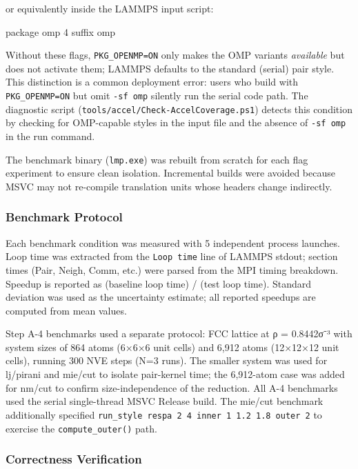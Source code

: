 \documentclass[
  11pt,
]{article}
\newenvironment{Shaded}{}{}
\newcommand{\NormalTok}[1]{#1}
\begin{document}
or equivalently inside the LAMMPS input script:

\begin{Shaded}
\begin{Highlighting}[]
\NormalTok{package omp 4}
\NormalTok{suffix omp}
\end{Highlighting}
\end{Shaded}

Without these flags, \texttt{PKG\_OPENMP=ON} only makes the OMP variants
\emph{available} but does not activate them; LAMMPS defaults to the
standard (serial) pair style. This distinction is a common deployment
error: users who build with \texttt{PKG\_OPENMP=ON} but omit
\texttt{-sf\ omp} silently run the serial code path. The diagnostic
script (\texttt{tools/accel/Check-AccelCoverage.ps1}) detects this
condition by checking for OMP-capable styles in the input file and the
absence of \texttt{-sf\ omp} in the run command.

The benchmark binary (\texttt{lmp.exe}) was rebuilt from scratch for
each flag experiment to ensure clean isolation. Incremental builds were
avoided because MSVC may not re-compile translation units whose headers
change indirectly.

\subsubsection{Benchmark Protocol}\label{benchmark-protocol}

Each benchmark condition was measured with 5 independent process
launches. Loop time was extracted from the \texttt{Loop\ time} line of
LAMMPS stdout; section times (Pair, Neigh, Comm, etc.) were parsed from
the MPI timing breakdown. Speedup is reported as (baseline loop time) /
(test loop time). Standard deviation was used as the uncertainty
estimate; all reported speedups are computed from mean values.

Step A-4 benchmarks used a separate protocol: FCC lattice at ρ =
0.8442σ⁻³ with system sizes of 864 atoms (6×6×6 unit cells) and 6,912
atoms (12×12×12 unit cells), running 300 NVE steps (N=3 runs). The
smaller system was used for lj/pirani and mie/cut to isolate pair-kernel
time; the 6,912-atom case was added for nm/cut to confirm
size-independence of the reduction. All A-4 benchmarks used the serial
single-thread MSVC Release build. The mie/cut benchmark additionally
specified \texttt{run\_style\ respa\ 2\ 4\ inner\ 1\ 1.2\ 1.8\ outer\ 2}
to exercise the \texttt{compute\_outer()} path.

\subsubsection{Correctness Verification}\label{correctness-verification}
\end{document}

